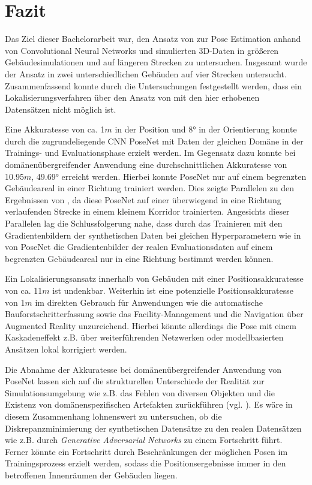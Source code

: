 
\section{Fazit}
\label{sec:kapitel_6}
Das Ziel dieser Bachelorarbeit war, den Ansatz von \citet{acharyaBIMPoseNetIndoorCamera2019} zur Pose Estimation anhand von Convolutional Neural Networks und simulierten 3D-Daten in größeren Gebäudesimulationen und auf längeren Strecken zu untersuchen.
Insgesamt wurde der Ansatz in zwei unterschiedlichen Gebäuden auf vier Strecken untersucht. Zusammenfassend konnte durch die Untersuchungen festgestellt werden, dass ein Lokalisierungsverfahren über den Ansatz von \citet{acharyaBIMPoseNetIndoorCamera2019} mit den hier erhobenen Datensätzen nicht möglich ist.


Eine Akkuratesse von ca. 1$m$ in der Position und 8° in der Orientierung konnte durch die zugrundeliegende CNN PoseNet mit Daten der gleichen Domäne in der Trainings- und Evaluationsphase erzielt werden. Im Gegensatz dazu konnte bei domänenübergreifender Anwendung eine durchschnittlichen Akkuratesse von 10.95$m$, 49.69° erreicht werden. Hierbei konnte PoseNet nur auf einem begrenzten Gebäudeareal in einer Richtung trainiert werden. Dies zeigte Parallelen zu den Ergebnissen von \citet{acharyaBIMPoseNetIndoorCamera2019}, da diese PoseNet auf einer überwiegend in eine Richtung verlaufenden Strecke in einem kleinem Korridor trainierten. Angesichts dieser Parallelen lag die Schlussfolgerung nahe, dass durch das Trainieren mit den Gradientenbildern der synthetischen Daten bei gleichen Hyperparametern wie in \cite{acharyaBIMPoseNetIndoorCamera2019} von PoseNet die Gradientenbilder der realen Evaluationsdaten auf einem begrenzten Gebäudeareal nur in eine Richtung bestimmt werden können.

Ein Lokalisierungsansatz innerhalb von Gebäuden mit einer Positionsakkuratesse von ca. 11$m$ ist undenkbar. Weiterhin ist eine potenzielle Positionsakkuratesse von 1$m$ im direkten Gebrauch für Anwendungen wie die automatische Bauforstschritterfassung sowie das Facility-Manage\-ment und die Navigation über Augmented Reality unzureichend. Hierbei könnte allerdings die Pose mit einem Kaskadeneffekt z.B. über weiterführenden Netzwerken oder modellbasierten Ansätzen lokal korrigiert werden.

Die Abnahme der Akkuratesse bei domänenübergreifender Anwendung von PoseNet lassen sich auf die strukturellen Unterschiede der Realität zur Simulationsumgebung wie z.B. das Fehlen von diversen Objekten und die Existenz von domänenspezifischen Artefakten zurückführen (vgl. \cite{acharyaBIMPoseNetIndoorCamera2019}). Es wäre in diesem Zusammenhang lohnenswert zu untersuchen, ob die Diskrepanzminimierung der synthetischen Datensätze zu den realen Datensätzen wie z.B. durch \textit{Generative Adversarial Networks} zu einem Fortschritt führt. Ferner könnte ein Fortschritt durch Beschränkungen der möglichen Posen im Trainingsprozess erzielt werden, sodass die Positionsergebnisse immer in den betroffenen Innenräumen der Gebäuden liegen.
